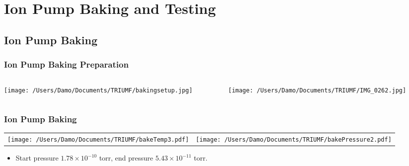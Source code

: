 \documentclass{beamer}
\begin{document}
\section{Ion Pump Baking and Testing}
\subsection{Ion Pump Baking}
\frame
{
  \frametitle{Ion Pump Baking Preparation}
  \begin{columns}[T]
    \begin{column}{0.5\textwidth}
    \texttt{[image: /Users/Damo/Documents/TRIUMF/bakingsetup.jpg]}
    \end{column}
    \begin{column}{0.5\textwidth}
    \texttt{[image: /Users/Damo/Documents/TRIUMF/IMG\_0262.jpg]}
    \end{column}
  \end{columns}
}
\frame
{
  \frametitle{Ion Pump Baking}
  \begin{table}[htdp]
  \centering
  \begin{tabular}{cc}
  \texttt{[image: /Users/Damo/Documents/TRIUMF/bakeTemp3.pdf]}&\texttt{[image: /Users/Damo/Documents/TRIUMF/bakePressure2.pdf]}\\
  \end{tabular}
  \end{table}%
  \begin{itemize}
  \item<1>Start pressure $1.78\times10^{-10}$ torr, end pressure $5.43\times10^{-11}$ torr.
  \end{itemize}
}
\end{document}
